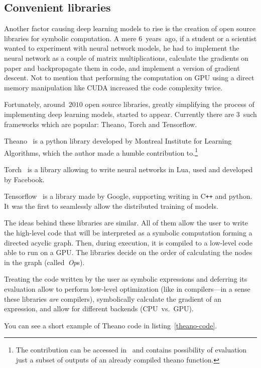 \subsection{Convenient libraries}
Another factor causing deep learning models to rise is the creation of open source libraries for symbolic computation. A mere $6$~years~ago, if a student or a scientist wanted to experiment with neural network models, he had to implement the neural network as a couple of matrix multiplications, calculate the gradients on paper and backpropagate them in code, and implement a version of gradient descent. Not to mention that performing the computation on GPU using a direct memory manipulation like CUDA increased the code complexity twice.

Fortunately, around~$2010$ open source libraries, greatly simplifying the process of implementing deep learning models, started to appear. Currently there are $3$~such frameworks which are popular: Theano, Torch and Tensorflow.

Theano~\cite{theano} is a python library developed by Montreal Institute for Learning Algorithms, which the author made a humble contribution to.\footnote{The contribution can be accessed in~\cite{theano-contrib} and contains possibility of evaluation just a subset of outputs of an already compiled theano function.}

Torch~\cite{torch} is a library allowing to write neural networks in Lua, used and developed by Facebook.

Tensorflow~\cite{tensorflow} is a library made by Google, supporting writing in C\texttt{++} and python. It was the first to seamlessly allow the distributed training of models.

The ideas behind these libraries are similar. All of them allow the user to write the high-level code that will be interpreted as a symbolic computation forming a directed acyclic graph. Then, during execution, it is compiled to a low-level code able to run on a GPU. The libraries decide on the order of calculating the nodes in the graph (called~\emph{Op}s).

Treating the code written by the user as symbolic expressions and deferring its evaluation allow to perform low-level optimization (like in compilers---in a sense these libraries \textit{are} compilers), symbolically calculate the gradient of an expression, and allow for different backends (CPU~vs.~GPU).

You can see a short example of Theano code in listing~\ref{theano-code}.

